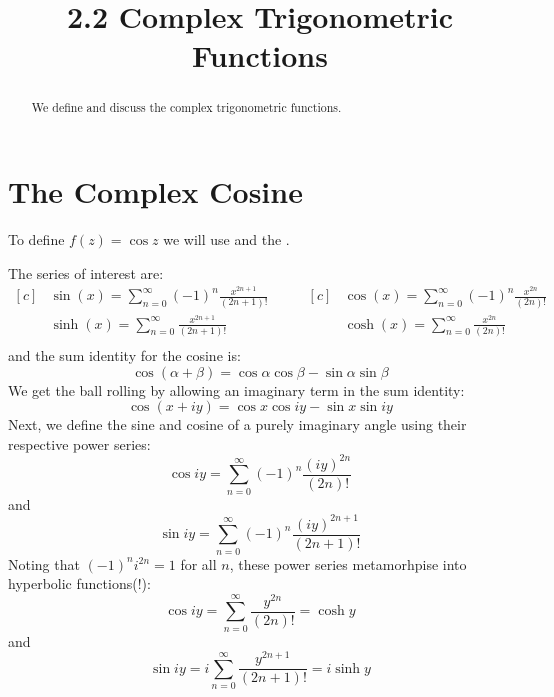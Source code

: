 \documentclass[handout]{ximera}
\title{2.2 Complex Trigonometric Functions}
\begin{document}
\begin{abstract}
We define and discuss the complex trigonometric functions.
\end{abstract}

\maketitle

\section{The Complex Cosine}

To define $f(z) = \cos z$ we will use 
and the 
.



The series of interest are:
\begin{equation*}
\begin{aligned}[c]
&\sin(x) =\sum_{n=0}^\infty (-1)^n \frac{x^{2n+1}}{(2n+1)!}\\
&\sinh(x)=\sum_{n=0}^\infty \frac{x^{2n+1}}{(2n+1)!}\\
\end{aligned}
\quad \quad
\begin{aligned}[c]
&\cos(x) =\sum_{n=0}^\infty (-1)^n \frac{x^{2n}}{(2n)!}\\
&\cosh(x)=\sum_{n=0}^\infty \frac{x^{2n}}{(2n)!}\\
\end{aligned}
\end{equation*}
and the sum identity for the cosine is:
\[
\cos(\alpha + \beta) = \cos\alpha \cos \beta - \sin \alpha \sin \beta
\]
We get the ball rolling by allowing an imaginary term in the sum identity:
\[
\cos(x+iy) = \cos x \cos iy - \sin x \sin iy
\]
Next, we define the sine and cosine of a purely imaginary angle using their respective power series:
\[
\cos iy = \sum_{n=0}^\infty (-1)^n \frac{(iy)^{2n}}{(2n)!} 
\]
and
\[
\sin iy = \sum_{n=0}^\infty (-1)^n \frac{(iy)^{2n+1}}{(2n+1)!} 
\]
Noting that $(-1)^n i^{2n} = 1$ for all $n$, these power series metamorhpise into hyperbolic functions(!): 
\[
\cos iy= \sum_{n=0}^\infty  \frac{y^{2n}}{(2n)!} = \cosh y
\]
and
\[
\sin iy= i\sum_{n=0}^\infty \frac {y^{2n+1}}{(2n+1)!}= i\sinh y
\]
\end{document}
